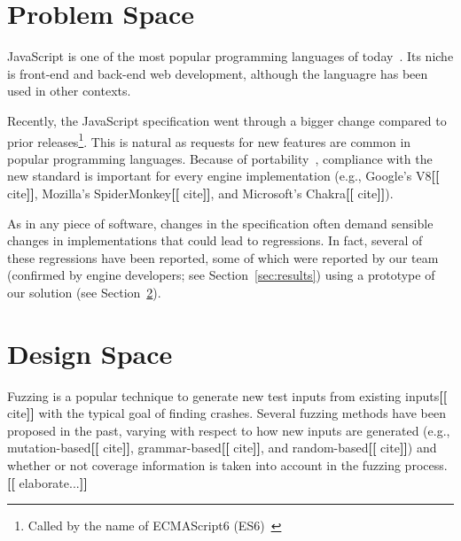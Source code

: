 \documentclass[11pt]{article}
\newcommand{\eg}{e.g.}
\newcommand{\Fix}[1]{\textbf{[[}{\color{red} #1}\textbf{]]}}
\newcommand{\Comment}[1]{}
\begin{document}
\section{Problem Space}

JavaScript is one of the most popular programming languages of
today~\cite{business-insider,stackify}. Its niche is front-end and
back-end web development\Comment{, supported several frameworks and
  runtimes (\eg{}, Express.js and Node.js)}, although the languagre
has been used in other contexts.

Recently, the JavaScript specification went through a bigger change
compared to prior releases\footnote{Called by the name of ECMAScript6
  (ES6)~\cite{es6-features}}. This is natural as requests for new
features are common in popular programming languages. Because of
portability~\cite{kangax}, compliance with the new standard is
important for every engine implementation (\eg{}, Google's
V8\Fix{cite}, Mozilla's SpiderMonkey\Fix{cite}, and Microsoft's
Chakra\Fix{cite}).

\begin{center}
\end{center}

As in any piece of software, changes in the specification often demand
sensible changes in implementations that could lead to regressions. In
fact, several of these regressions have been reported, some of which
were reported by our team (confirmed by engine developers; see
Section~\ref{sec:results}) using a prototype of our solution (see
Section~\ref{sec:design}).

\section{Design Space}
\label{sec:design}

Fuzzing is a popular technique to generate new test inputs from
existing inputs\Fix{cite} with the typical goal of finding
crashes. Several fuzzing methods have been proposed in the past,
varying with respect to how new inputs are generated (\eg{},
mutation-based\Fix{cite}, grammar-based\Fix{cite}, and
random-based\Fix{cite}) and whether or not coverage information is
taken into account in the fuzzing process.\Fix{elaborate...}
\end{document}
